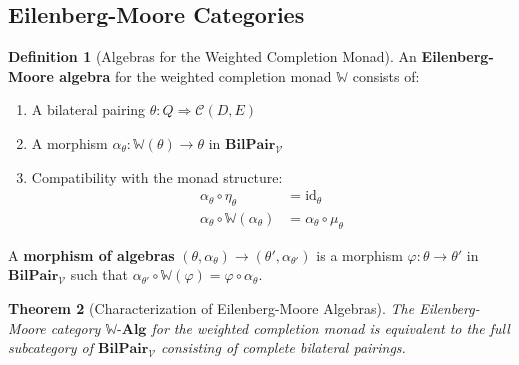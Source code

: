 \documentclass[11pt]{article}
\theoremstyle{plain}
\newtheorem{theorem}{Theorem}[section]
\theoremstyle{definition}
\newtheorem{definition}[theorem]{Definition}
\theoremstyle{remark}
\newcommand{\V}{\mathcal{V}}
\newcommand{\C}{\mathcal{C}}
\newcommand{\id}{\mathrm{id}}
\begin{document}
\subsection{Eilenberg-Moore Categories}

\begin{definition}[Algebras for the Weighted Completion Monad]\label{def:completion-algebras}
An \textbf{Eilenberg-Moore algebra} for the weighted completion monad $\mathbb{W}$ consists of:
\begin{enumerate}
\item A bilateral pairing $\theta : Q \Rightarrow \C(D, E)$
\item A morphism $\alpha_\theta : \mathbb{W}(\theta) \to \theta$ in $\mathbf{BilPair}_\V$
\item Compatibility with the monad structure:
\begin{align}
\alpha_\theta \circ \eta_\theta &= \id_\theta \\
\alpha_\theta \circ \mathbb{W}(\alpha_\theta) &= \alpha_\theta \circ \mu_\theta
\end{align}
\end{enumerate}

A \textbf{morphism of algebras} $(θ, α_θ) → (θ', α_{θ'})$ is a morphism $φ : θ → θ'$ in $\mathbf{BilPair}_\V$ such that $α_{θ'} \circ \mathbb{W}(φ) = φ \circ α_θ$.
\end{definition}

\begin{theorem}[Characterization of Eilenberg-Moore Algebras]\label{thm:em-characterization}
The Eilenberg-Moore category $\mathbb{W}\text{-}\mathbf{Alg}$ for the weighted completion monad is equivalent to the full subcategory of $\mathbf{BilPair}_\V$ consisting of complete bilateral pairings.
\end{theorem}
\end{document}
